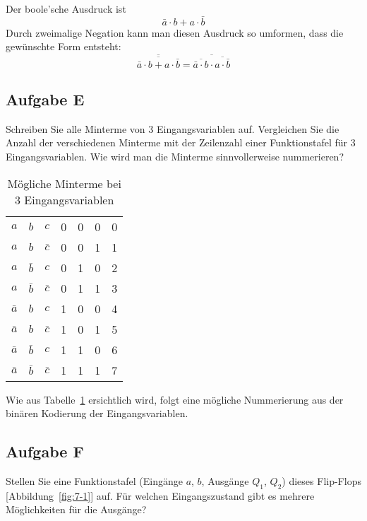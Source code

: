 Der boole'sche Ausdruck ist 
\[
    \bar a \cdot b + a \cdot \bar b
\]
Durch zweimalige Negation kann man diesen Ausdruck so umformen, dass die
gewünschte Form entsteht:
\[
    \overline{\overline{\bar a \cdot b + a \cdot \bar b}} =
    \overline{\overline{\bar a \cdot b} \cdot \overline{a \cdot \bar b}} 
\]

\FloatBarrier
\subsection{Aufgabe E}

\begin{problem}
    Schreiben Sie alle Minterme von 3 Eingangsvariablen auf. Vergleichen Sie
    die Anzahl der verschiedenen Minterme mit der Zeilenzahl einer
    Funktionstafel für 3 Eingangsvariablen. Wie wird man die Minterme
    sinnvollerweise nummerieren?
\end{problem}

\begin{table}[htbp]
    \centering
        \begin{tabular}{ccc|ccc|c}
            $a$ & $b$ & $c$ & 0 & 0 & 0 & 0\\
            $a$ & $b$ & $\bar c$ & 0 & 0 & 1 & 1\\
            $a$ & $\bar b$ & $c$ & 0 & 1 & 0 & 2\\
            $a$ & $\bar b$ & $\bar c$ & 0 & 1 & 1 & 3\\
            $\bar a$ & $b$ & $c$ & 1 & 0 & 0 & 4\\
            $\bar a$ & $b$ & $\bar c$ & 1 & 0 & 1 & 5\\
            $\bar a$ & $\bar b$ & $c$ & 1 & 1 & 0 & 6\\
            $\bar a$ & $\bar b$ & $\bar c$ & 1 & 1 & 1 & 7\\
        \end{tabular}
        \caption{%
            Mögliche Minterme bei 3 Eingangsvariablen
        }
        \label{tab:Aufgabe_E}
\end{table}

Wie aus Tabelle~\ref{tab:Aufgabe_E} ersichtlich wird, folgt eine mögliche
Nummerierung aus der binären Kodierung der Eingangsvariablen.

\subsection{Aufgabe F}

\begin{problem}
    Stellen Sie eine Funktionstafel (Eingänge $a$, $b$, Ausgänge $Q_1$, $Q_2$)
    dieses Flip-Flops [Abbildung~\ref{fig:7-1}] auf. Für welchen
    Eingangszustand gibt es mehrere Möglichkeiten für die Ausgänge?
\end{problem}

